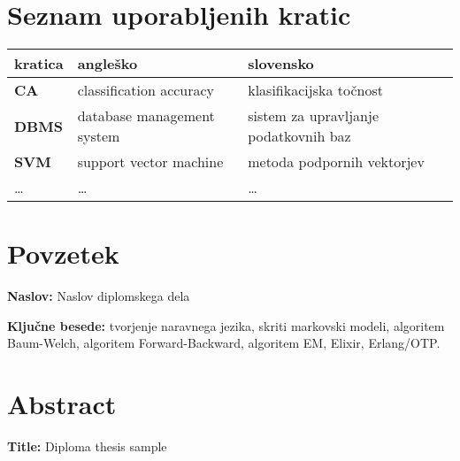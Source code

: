 \documentclass[a4paper, 12pt]{book}
\newcommand{\ttitle}{Naslov diplomskega dela}
\newcommand{\ttitleEn}{Diploma thesis sample}
\newcommand{\tkeywords}{tvorjenje naravnega jezika, skriti markovski modeli,
algoritem Baum-Welch, algoritem Forward-Backward, algoritem EM,
Elixir, Erlang/OTP}
\newcommand{\clearemptydoublepage}{\newpage{\pagestyle{empty}\cleardoublepage}}
\begin{document}
\clearemptydoublepage

\pagestyle{empty}
\def\thepage{} %
\tableofcontents{}


\clearemptydoublepage


\chapter*{Seznam uporabljenih kratic}

\begin{tabular}{l|l|l}
  {\bf kratica} & {\bf angleško} & {\bf slovensko} \\ \hline
  {\bf CA} & classification accuracy & klasifikacijska točnost \\
  {\bf DBMS} & database management system & sistem za upravljanje podatkovnih baz \\
  {\bf SVM} & support vector machine & metoda podpornih vektorjev \\
  \dots & \dots & \dots \\
\end{tabular}



\clearemptydoublepage

\chapter*{Povzetek}

\noindent\textbf{Naslov:} \ttitle
\bigskip

\noindent
\bigskip

\noindent\textbf{Ključne besede:} \tkeywords.
\clearemptydoublepage

\chapter*{Abstract}

\noindent\textbf{Title:} \ttitleEn
\bigskip

\noindent
\bigskip
\end{document}
